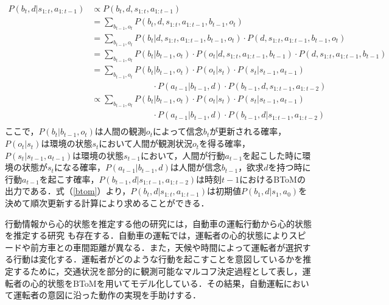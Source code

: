 \begin{equation}
  \begin{split}
  \label{btom}
  P(b_t,d|s_{1:t},a_{1:t-1}) &\propto P(b_t,d,s_{1:t},a_{1:t-1})\\
  &= \sum_{b_{t-1},o_t}P(b_t,d,s_{1:t},a_{1:t-1},b_{t-1},o_t)\\
  &= \sum_{b_{t-1},o_t}P(b_t|d,s_{1:t},a_{1:t-1},b_{t-1},o_t)\cdot P(d,s_{1:t},a_{1:t-1},b_{t-1},o_t)\\
  &= \sum_{b_{t-1},o_t}P(b_t|b_{t-1},o_t)\cdot P(o_t|d,s_{1:t},a_{1:t-1},b_{t-1})\cdot P(d,s_{1:t},a_{1:t-1},b_{t-1})\\
  &= \sum_{b_{t-1},o_t}P(b_t|b_{t-1},o_t)\cdot P(o_t|s_t)\cdot P(s_t|s_{t-1},a_{t-1})\\
  &\hspace{3cm} \cdot P(a_{t-1}|b_{t-1},d)\cdot P(b_{t-1},d,s_{1:t-1},a_{1:t-2})\\
  &\propto \sum_{b_{t-1},o_t}P(b_t|b_{t-1},o_t)\cdot P(o_t|s_t)\cdot P(s_t|s_{t-1},a_{t-1})\\
  &\hspace{3cm} \cdot P(a_{t-1}|b_{t-1},d)\cdot P(b_{t-1},d|s_{1:t-1},a_{1:t-2})\\
  \end{split}
\end{equation}
ここで，$P(b_t|b_{t-1},o_t)$は人間の観測$o_t$によって信念$b_t$が更新される確率，$P(o_t|s_t)$は環境の状態$s_t$において人間が観測状況$o_t$を得る確率，$P(s_t|s_{t-1},a_{t-1})$は環境の状態$s_{t-1}$において，人間が行動$a_{t-1}$を起こした時に環境の状態が$s_t$になる確率，$P(a_{t-1}|b_{t-1},d)$は人間が信念$b_{t-1}$，欲求$d$を持つ時に行動$a_{t-1}$を起こす確率，$P(b_{t-1},d|s_{1:t-1},a_{1:t-2})$は時刻$t-1$におけるBToMの出力である．式（\ref{btom}）より，$P(b_t,d|s_{1:t},a_{1:t-1})$は初期値$P(b_1,d|s_1,a_0)$を決めて順次更新する計算により求めることができる．


\par
行動情報から心的状態を推定する他の研究には，自動車の運転行動から心的状態を推定する研究 \cite{darwish2020learning}も存在する．自動車の運転では，運転者の心的状態によりスピードや前方車との車間距離が異なる．また，天候や時間によって運転者が選択する行動は変化する．運転者がどのような行動を起こすことを意図しているかを推定するために，交通状況を部分的に観測可能なマルコフ決定過程として表し，運転者の心的状態をBToMを用いてモデル化している．その結果，自動運転において運転者の意図に沿った動作の実現を手助けする．

